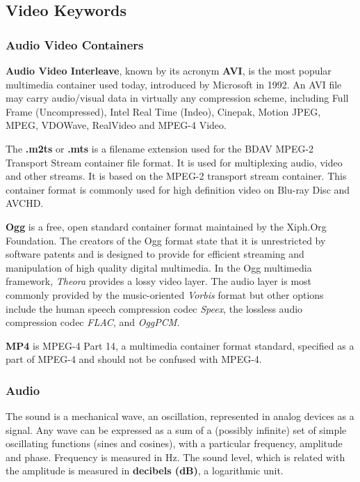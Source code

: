 \subsection{Video Keywords}
\label{subsec:multimedia-dist:video-keywords}

\subsubsection{Audio Video Containers}

\textbf{Audio Video Interleave}, known by its acronym \textbf{AVI}, is the
most popular multimedia container used today, introduced by Microsoft in 1992.
An AVI file may carry audio/visual data in virtually any compression scheme,
including Full Frame (Uncompressed), Intel Real Time (Indeo), Cinepak, Motion
JPEG, MPEG, VDOWave, RealVideo and MPEG-4 Video.

The \textbf{.m2ts} or \textbf{.mts} is a filename extension used for the BDAV
MPEG-2 Transport Stream container file format. It is used for multiplexing
audio, video and other streams. It is based on the MPEG-2 transport stream
container. This container format is commonly used for high definition video on
Blu-ray Disc and AVCHD.

\textbf{Ogg} is a free, open standard container format maintained by the
Xiph.Org Foundation. The creators of the Ogg format state that it is
unrestricted by software patents and is designed to provide for efficient
streaming and manipulation of high quality digital multimedia. In the Ogg
multimedia framework, \textit{Theora} provides a lossy video layer. The audio
layer is most commonly provided by the music-oriented \textit{Vorbis} format
but other options include the human speech compression codec \textit{Speex},
the lossless audio compression codec \textit{FLAC}, and \textit{OggPCM}.

\textbf{MP4} is MPEG-4 Part 14, a multimedia container format standard,
specified as a part of MPEG-4 and should not be confused with MPEG-4.

\subsubsection{Audio}

The sound is a mechanical wave, an oscillation, represented in analog devices
as a signal. Any wave can be expressed as a sum of a (possibly infinite) set
of simple oscillating functions (sines and cosines), with a particular
frequency, amplitude and phase. Frequency is measured in Hz. The sound level,
which is related with the amplitude is measured in \textbf{decibels (dB)}, a
logarithmic unit.

